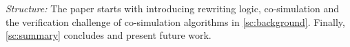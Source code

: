 \textit{Structure:}
The paper starts with introducing rewriting logic, co-simulation and the verification challenge of co-simulation algorithms in \cref{sc:background}. 
Finally, \cref{sc:summary} concludes and present future work.
